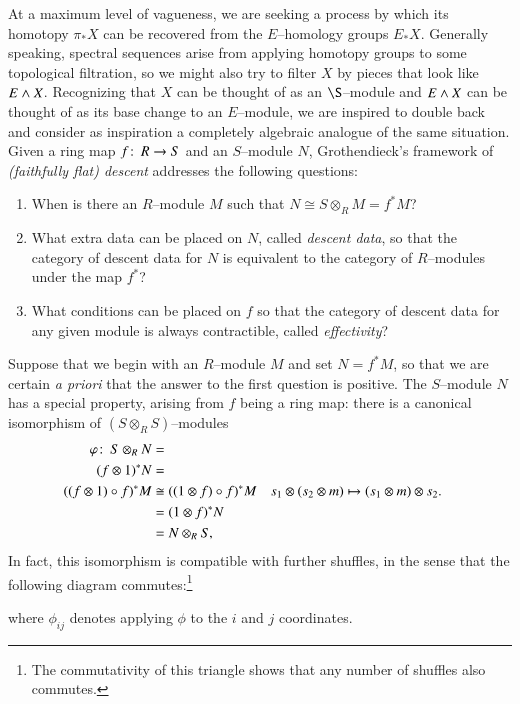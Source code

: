 At a maximum level of vagueness, we are seeking a process by which its homotopy $\pi_* X$ can be recovered from the $E$--homology groups $E_* X$.  Generally speaking, spectral sequences arise from applying homotopy groups to some topological filtration, so we might also try to filter $X$ by pieces that look like $E \wedge X$.  Recognizing that $X$ can be thought of as an $\S$--module and $E \wedge X$ can be thought of as its base change to an $E$--module, we are inspired to double back and consider as inspiration a completely algebraic analogue of the same situation.  Given a ring map $f\colon\thinspace R \to S$ and an $S$--module $N$, Grothendieck's framework of \textit{(faithfully flat) descent} addresses the following questions:
\begin{enumerate}
\item When is there an $R$--module $M$ such that $N \cong S \otimes_R M = f^* M$?
\item What extra data can be placed on $N$, called \textit{descent data}, so that the category of descent data for $N$ is equivalent to the category of $R$--modules under the map $f^*$?
\item What conditions can be placed on $f$ so that the category of descent data for any given module is always contractible, called \textit{effectivity}?
\end{enumerate}

Suppose that we begin with an $R$--module $M$ and set $N = f^* M$, so that we are certain \emph{a priori} that the answer to the first question is positive.  The $S$--module $N$ has a special property, arising from $f$ being a ring map: there is a canonical isomorphism of $(S \otimes_R S)$--modules
\begin{align*}
\varphi\colon\thinspace S \otimes_R N & = \\
(f \otimes 1)^* N & = \\
((f \otimes 1) \circ f)^* M & \cong ((1 \otimes f) \circ f)^* M & s_1 \otimes (s_2 \otimes m) & \mapsto (s_1 \otimes m) \otimes s_2. \\
& = (1 \otimes f)^* N \\
& = N \otimes_R S,
\end{align*}
In fact, this isomorphism is compatible with further shuffles, in the sense that the following diagram commutes:\footnote{The commutativity of this triangle shows that any number of shuffles also commutes.}
\begin{center}
\end{center}
where $\phi_{ij}$ denotes applying $\phi$ to the $i${\th} and $j${\th} coordinates.

